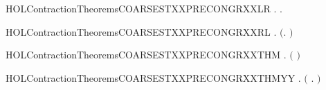 \newcommand{\HOLContractionTheoremsCOARSESTXXPRECONGRXXLEMMA}{\UseVerbatim{HOLContractionTheoremsCOARSESTXXPRECONGRXXLEMMA}}
\begin{SaveVerbatim}{HOLContractionTheoremsCOARSESTXXPRECONGRXXLR}
\HOLTokenTurnstile{} \HOLSymConst{\HOLTokenForall{}} .    \HOLSymConst{\HOLTokenImp{}} \HOLSymConst{\HOLTokenForall{}}.  \HOLSymConst{\ensuremath{+}}    \HOLSymConst{\ensuremath{+}} 
\end{SaveVerbatim}
\newcommand{\HOLContractionTheoremsCOARSESTXXPRECONGRXXLR}{\UseVerbatim{HOLContractionTheoremsCOARSESTXXPRECONGRXXLR}}
\begin{SaveVerbatim}{HOLContractionTheoremsCOARSESTXXPRECONGRXXRL}
\HOLTokenTurnstile{} \HOLSymConst{\HOLTokenForall{}} .
         \HOLSymConst{\HOLTokenConj{}}   \HOLSymConst{\HOLTokenImp{}}
       \ensuremath{(}\HOLSymConst{\HOLTokenForall{}}.  \HOLSymConst{\ensuremath{+}}    \HOLSymConst{\ensuremath{+}} \ensuremath{)} \HOLSymConst{\HOLTokenImp{}}
         
\end{SaveVerbatim}
\newcommand{\HOLContractionTheoremsCOARSESTXXPRECONGRXXRL}{\UseVerbatim{HOLContractionTheoremsCOARSESTXXPRECONGRXXRL}}
\begin{SaveVerbatim}{HOLContractionTheoremsCOARSESTXXPRECONGRXXTHM}
\HOLTokenTurnstile{} \HOLSymConst{\HOLTokenForall{}} .
         \HOLSymConst{\HOLTokenConj{}}   \HOLSymConst{\HOLTokenImp{}}
       \ensuremath{(}   \HOLSymConst{\HOLTokenEquiv{}}   \ensuremath{)}
\end{SaveVerbatim}
\newcommand{\HOLContractionTheoremsCOARSESTXXPRECONGRXXTHM}{\UseVerbatim{HOLContractionTheoremsCOARSESTXXPRECONGRXXTHM}}
\begin{SaveVerbatim}{HOLContractionTheoremsCOARSESTXXPRECONGRXXTHMYY}
\HOLTokenTurnstile{} \HOLSymConst{\HOLTokenForall{}} .
         \HOLSymConst{\HOLTokenConj{}}   \HOLSymConst{\HOLTokenImp{}}
       \ensuremath{(}   \HOLSymConst{\HOLTokenEquiv{}} \HOLSymConst{\HOLTokenForall{}}.  \HOLSymConst{\ensuremath{+}}    \HOLSymConst{\ensuremath{+}} \ensuremath{)}
\end{SaveVerbatim}
